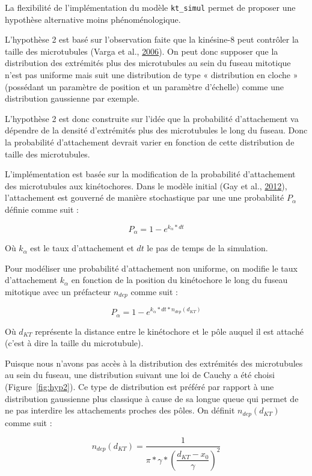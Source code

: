 \documentclass[12pt,a4paper,twoside,openright]{book}
\begin{document}
La flexibilité de l'implémentation du modèle \texttt{kt\_simul} permet
de proposer une hypothèse alternative moins phénoménologique.

L'hypothèse 2 est basé sur l'observation faite que la kinésine-8 peut
contrôler la taille des microtubules (Varga et al.,
\hyperref[ref-Varga2006]{2006}). On peut donc supposer que la
distribution des extrémités plus des microtubules au sein du fuseau
mitotique n'est pas uniforme mais suit une distribution de type «
distribution en cloche » (possédant un paramètre de position et un
paramètre d'échelle) comme une distribution gaussienne par exemple.

L'hypothèse 2 est donc construite sur l'idée que la probabilité
d'attachement va dépendre de la densité d'extrémités plus des
microtubules le long du fuseau. Donc la probabilité d'attachement
devrait varier en fonction de cette distribution de taille des
microtubules.

L'implémentation est basée sur la modification de la probabilité
d'attachement des microtubules aux kinétochores. Dans le modèle initial
(Gay et al., \hyperref[ref-Gay2012a]{2012}), l'attachement est gouverné
de manière stochastique par une une probabilité \(P_{\alpha}\) définie
comme suit :

\[
P_{\alpha} = 1 - e^{k_{\alpha}*dt}
\]

Où \(k_{\alpha}\) est le taux d'attachement et \(dt\) le pas de temps de
la simulation.

Pour modéliser une probabilité d'attachement non uniforme, on modifie le
taux d'attachement \(k_{\alpha}\) en fonction de la position du
kinétochore le long du fuseau mitotique avec un préfacteur \(n_{dep}\)
comme suit :

\[
P_{\alpha} = 1 - e^{k_{\alpha}*dt*n_{dep}(d_{KT})}
\]

Où \(d_{KT}\) représente la distance entre le kinétochore et le pôle
auquel il est attaché (c'est à dire la taille du microtubule).

Puisque nous n'avons pas accès à la distribution des extrémités des
microtubules au sein du fuseau, une distribution suivant une loi de
Cauchy a été choisi (Figure~\ref{fig:hyp2}). Ce type de distribution est
préféré par rapport à une distribution gaussienne plus classique à cause
de sa longue queue qui permet de ne pas interdire les attachements
proches des pôles. On définit \(n_{dep}(d_{KT})\) comme suit :

\[
n_{dep}(d_{KT}) = \dfrac{1}{\pi * \gamma * (\dfrac{d_{KT} - x_0}{\gamma})^2}
\]
\end{document}
